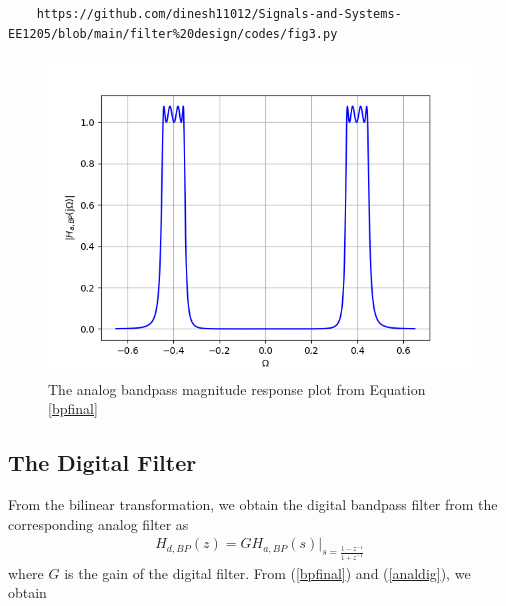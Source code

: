 \documentclass{article}
\begin{document}
\begin{lstlisting}
	https://github.com/dinesh11012/Signals-and-Systems-EE1205/blob/main/filter%20design/codes/fig3.py
\end{lstlisting}
\begin{figure}[H]
\includegraphics[width = \columnwidth]{figs/fig3.png}
\caption{The analog bandpass magnitude response plot from Equation \ref{bpfinal}} 
\label{fig4}
\end{figure}

\subsection{The Digital Filter}
From the bilinear transformation, we obtain the digital bandpass filter from the corresponding analog filter as
\begin{eqnarray}
\label{analdig}
H_{d,BP}(z) = GH_{a,BP}(s)\vert_{s = \frac{1-z^{-1}}{1 + z^{-1}}}
\end{eqnarray}
where $G$ is the gain of the digital filter.  From (\ref{bpfinal}) and (\ref{analdig}), we obtain
\end{document}
